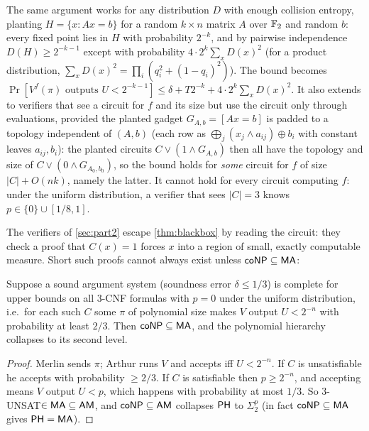 \begin{remark}
The same argument works for any distribution $D$ with enough collision entropy,
planting $H=\{x:Ax=b\}$ for a random $k\times n$ matrix $A$ over $\mathbb{F}_2$ and random
$b$: every fixed point lies in $H$ with probability $2^{-k}$, and by pairwise
independence $D(H)\ge2^{-k-1}$ except with probability $4\cdot2^{k}\sum_xD(x)^2$
(for a product distribution, $\sum_xD(x)^2=\prod_i(q_i^2+(1-q_i)^2)$). The bound
becomes $\Pr[V^f(\pi)\text{ outputs }U<2^{-k-1}]\le\delta+T2^{-k}+4\cdot2^k\sum_xD(x)^2$.
It also extends to verifiers that see a circuit for $f$ and its size but use the
circuit only through evaluations, provided the planted gadget $G_{A,b}=[Ax=b]$ is
padded to a topology independent of $(A,b)$ (each row as
$\bigoplus_j(x_j\wedge a_{ij})\oplus b_i$ with constant leaves $a_{ij},b_i$): the
planted circuits $C\vee(1\wedge G_{A,b})$ then all have the topology and size of
$C\vee(0\wedge G_{A_0,b_0})$, so the bound holds for \emph{some} circuit for $f$ of
size $|C|+O(nk)$, namely the latter. It cannot hold for every circuit computing $f$:
under the uniform distribution, a verifier that sees $|C|=3$ knows
$p\in\{0\}\cup[1/8,1]$.
\end{remark}

The verifiers of \cref{sec:part2} escape \cref{thm:blackbox} by reading the
circuit: they check a proof that $C(x)=1$ forces $x$ into a region of small,
exactly computable measure. Short such proofs cannot always exist unless
$\mathsf{coNP}\subseteq\mathsf{MA}$:

\begin{theorem}\label{thm:ma}
Suppose a sound argument system (soundness error $\delta\le1/3$) is complete
for upper bounds on all 3-CNF formulas with $p=0$ under the uniform
distribution, i.e.\ for each such $C$ some $\pi$ of polynomial size makes $V$
output $U<2^{-n}$ with probability at least $2/3$. Then $\mathsf{coNP}\subseteq\mathsf{MA}$,
and the polynomial hierarchy collapses to its second level.
\end{theorem}

\begin{proof}
Merlin sends $\pi$; Arthur runs $V$ and accepts iff $U<2^{-n}$. If $C$ is
unsatisfiable he accepts with probability $\ge2/3$. If $C$ is satisfiable then
$p\ge2^{-n}$, and accepting means $V$ output $U<p$, which happens with
probability at most $1/3$. So 3-UNSAT$\in\mathsf{MA}\subseteq\mathsf{AM}$, and
$\mathsf{coNP}\subseteq\mathsf{AM}$ collapses $\mathsf{PH}$ to $\Sigma_2^p$ \cite{bhz1987} (in fact
$\mathsf{coNP}\subseteq\mathsf{MA}$ gives $\mathsf{PH}=\mathsf{MA}$).
\end{proof}

